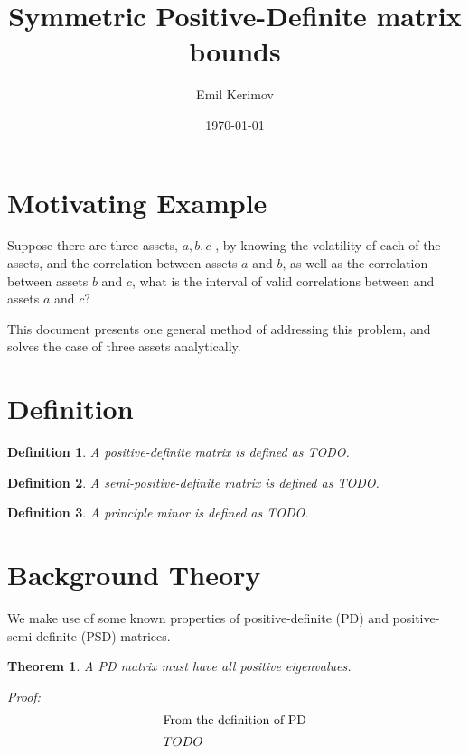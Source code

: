 \documentclass[a4paper]{article}
\title{Symmetric Positive-Definite matrix bounds}
\author{Emil Kerimov}
\date{\today}
\begin{document}
\maketitle

\newtheorem{theorem}{Theorem}[section]
\newtheorem{corollary}{Corollary}[theorem]
\newtheorem{lemma}[theorem]{Lemma}
\newtheorem{definition}{Definition}[section]

\section{Motivating Example}
Suppose there are three assets, $a,b,c$ , by knowing the volatility of each of the assets, and the correlation between assets $a$ and $b$, as well as the correlation between assets $b$ and $c$, what is the interval of valid correlations between and assets $a$ and $c$?

This document presents one general method of addressing this problem, and solves the case of three assets analytically.

\section{Definition}

\begin{definition}\label{PD}
A positive-definite matrix is defined as TODO.
\end{definition}

\begin{definition}\label{PSD}
A semi-positive-definite matrix is defined as TODO.
\end{definition}

\begin{definition}\label{principle minor}
A principle minor is defined as TODO.
\end{definition}

\section{Background Theory}
We make use of some known properties of positive-definite (PD) and positive-semi-definite (PSD) matrices. 

\begin{theorem} \label{PD implies positive eigenvalues} 
A PD matrix must have all positive eigenvalues.

Proof:
\begin{gather*}
\shortintertext{From the definition of PD}
TODO
\end{gather*}
\end{theorem}
\end{document}
